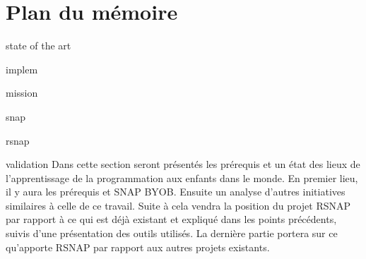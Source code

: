 \section{Plan du mémoire}
state of the art

implem

	mission

	snap

	rsnap

	validation
Dans cette section seront présentés les prérequis et un état des lieux de l'apprentissage de la programmation aux enfants dans le monde. En premier lieu, il y aura les prérequis et SNAP BYOB. Ensuite un analyse d'autres initiatives similaires à celle de ce travail. Suite à cela vendra la position du projet RSNAP par rapport à ce qui est déjà existant et expliqué dans les points précédents, suivis d'une présentation des outils utilisés. La dernière partie portera sur ce qu'apporte RSNAP par rapport aux autres projets existants. 
